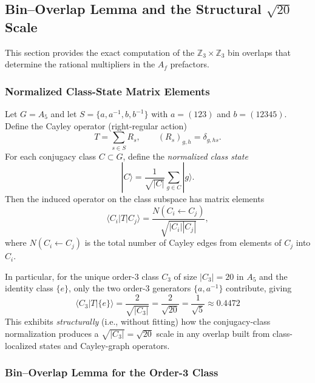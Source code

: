 \subsection{Bin--Overlap Lemma and the Structural $\sqrt{20}$ Scale}
\label{app:bin_overlap_closure}

This section provides the exact computation of the $\mathbb{Z}_3 \times \mathbb{Z}_3$ 
bin overlaps that determine the rational multipliers in the $A_f$ prefactors.

\subsubsection{Normalized Class-State Matrix Elements}

Let $G = A_5$ and let $S = \{a, a^{-1}, b, b^{-1}\}$ with $a = (123)$ and $b = (12345)$.
Define the Cayley operator (right-regular action)
\begin{equation}
T = \sum_{s \in S} R_s, \qquad (R_s)_{g,h} = \delta_{g,hs}.
\end{equation}
For each conjugacy class $C \subset G$, define the \emph{normalized class state}
\begin{equation}
|C\rangle = \frac{1}{\sqrt{|C|}} \sum_{g \in C} |g\rangle.
\end{equation}
Then the induced operator on the class subspace has matrix elements
\begin{equation}
\langle C_i | T | C_j \rangle = \frac{N(C_i \leftarrow C_j)}{\sqrt{|C_i||C_j|}},
\end{equation}
where $N(C_i \leftarrow C_j)$ is the total number of Cayley edges from elements of $C_j$ into $C_i$.

In particular, for the unique order-3 class $C_3$ of size $|C_3| = 20$ in $A_5$ and the 
identity class $\{e\}$, only the two order-3 generators $\{a, a^{-1}\}$ contribute, giving
\begin{equation}
\boxed{\langle C_3 | T | \{e\} \rangle = \frac{2}{\sqrt{|C_3|}} = \frac{2}{\sqrt{20}} = \frac{1}{\sqrt{5}} \approx 0.4472}
\end{equation}
This exhibits \emph{structurally} (i.e., without fitting) how the conjugacy-class normalization 
produces a $\sqrt{|C_3|} = \sqrt{20}$ scale in any overlap built from class-localized states 
and Cayley-graph operators.

\subsubsection{Bin--Overlap Lemma for the Order-3 Class}

